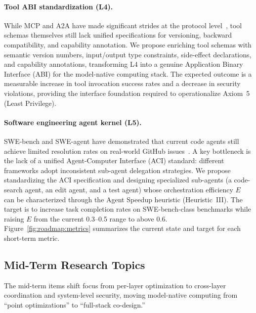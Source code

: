 \paragraph{Tool ABI standardization (L4).}
While MCP and A2A have made significant strides at the protocol level~\cite{mcp_intro_2026,agentprotocols2025}, tool schemas themselves still lack unified specifications for versioning, backward compatibility, and capability annotation.
We propose enriching tool schemas with semantic version numbers, input/output type constraints, side-effect declarations, and capability annotations, transforming L4 into a genuine Application Binary Interface (ABI) for the model-native computing stack.
The expected outcome is a measurable increase in tool invocation success rates and a decrease in security violations, providing the interface foundation required to operationalize Axiom~5 (Least Privilege).

\paragraph{Software engineering agent kernel (L5).}
SWE-bench and SWE-agent have demonstrated that current code agents still achieve limited resolution rates on real-world GitHub issues~\cite{swebench2023,sweagent2024}.
A key bottleneck is the lack of a unified Agent-Computer Interface (ACI) standard: different frameworks adopt inconsistent sub-agent delegation strategies.
We propose standardizing the ACI specification and designing specialized sub-agents (a code-search agent, an edit agent, and a test agent) whose orchestration efficiency $E$ can be characterized through the Agent Speedup heuristic (Heuristic~III).
The target is to increase task completion rates on SWE-bench-class benchmarks while raising $E$ from the current 0.3--0.5 range to above 0.6.
Figure~\ref{fig:roadmap:metrics} summarizes the current state and target for each short-term metric.


\subsection{Mid-Term Research Topics}

The mid-term items shift focus from per-layer optimization to cross-layer coordination and system-level security, moving model-native computing from ``point optimizations'' to ``full-stack co-design.''

